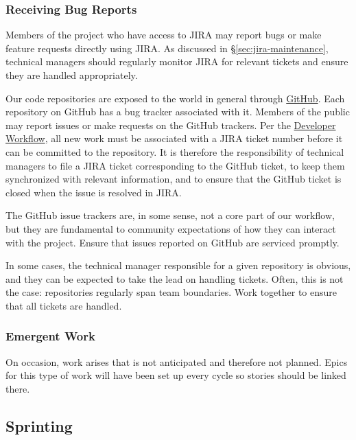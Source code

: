 \begin{itemize}
\subsubsection{Receiving Bug Reports}
\label{receiving-bug-reports}

Members of the project who have access to \gls{JIRA} may report bugs or make feature requests directly using \gls{JIRA}.
As discussed in \S\ref{sec:jira-maintenance}, technical managers should regularly monitor \gls{JIRA} for relevant tickets and ensure they are handled appropriately.

Our code repositories are exposed to the world in general through \href{https://github.com/lsst/}{GitHub}.
Each repository on GitHub has a bug tracker associated with it.
Members of the public may report issues or make requests on the GitHub trackers.
Per the \href{https://developer.lsst.io/processes/workflow.html}{Developer Workflow}, all new work must be associated with a \gls{JIRA} ticket number before it can be committed to the repository.
It is therefore the responsibility of technical managers to file a \gls{JIRA} ticket corresponding to the GitHub ticket, to keep them synchronized with relevant information, and to ensure that the GitHub ticket is closed when the issue is resolved in \gls{JIRA}.

The GitHub issue trackers are, in some sense, not a core part of our
workflow, but they are fundamental to community expectations of how they
can interact with the project. Ensure that issues reported on GitHub are
serviced promptly.

In some cases, the technical manager responsible for a given repository
is obvious, and they can be expected to take the lead on handling
tickets. Often, this is not the case: repositories regularly span team
boundaries. Work together to ensure that all tickets are handled.

\subsubsection{Emergent Work}
\label{emergent-work}

On occasion, work arises that is not anticipated and therefore not planned.  Epics for this type of work will have been set up every cycle so stories should be linked there.


\subsection{Sprinting}
\label{sec:sprinting}


\end{itemize}
